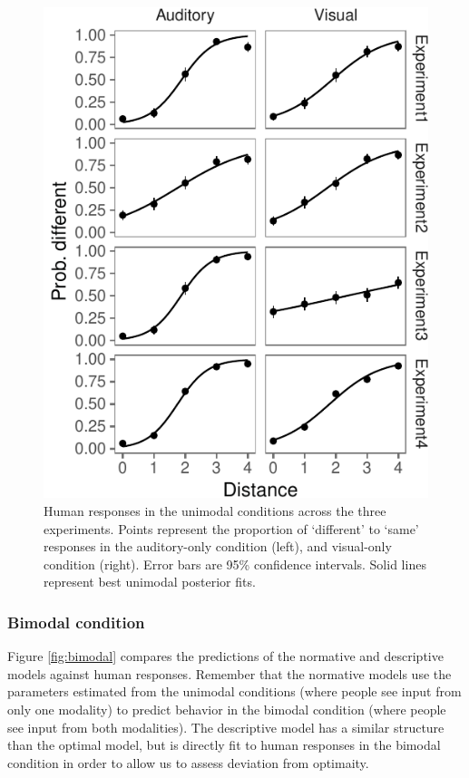 \documentclass[english,,man,floatsintext]{apa6}
\theoremstyle{definition}
\theoremstyle{definition}
\theoremstyle{definition}
\theoremstyle{remark}
\begin{document}
\begin{figure}[!h]
\includegraphics[width=\textwidth]{ms_files/figure-latex/unimodal-1} \caption{Human responses in the unimodal conditions across the three experiments. Points represent the proportion of `different' to `same' responses in the auditory-only condition (left), and visual-only condition (right). Error bars are 95\% confidence intervals. Solid lines represent best unimodal posterior fits.}\label{fig:unimodal}
\end{figure}

\subsubsection{Bimodal condition}\label{bimodal-condition-1}

Figure \ref{fig:bimodal} compares the predictions of the normative and
descriptive models against human responses. Remember that the normative
models use the parameters estimated from the unimodal conditions (where
people see input from only one modality) to predict behavior in the
bimodal condition (where people see input from both modalities). The
descriptive model has a similar structure than the optimal model, but is
directly fit to human responses in the bimodal condition in order to
allow us to assess deviation from optimaity.
\end{document}
